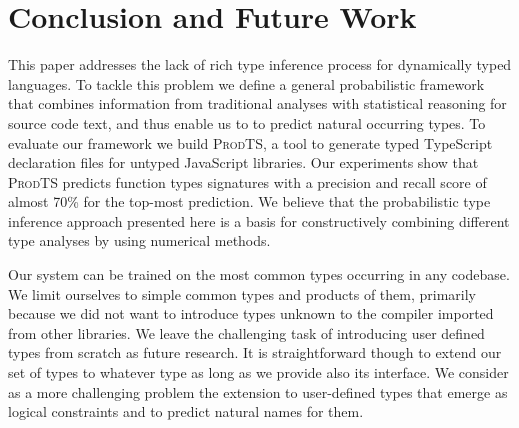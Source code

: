 \documentclass[sigplan,10pt,review,anonymous]{acmart} %
\newcommand{\prodts}{\textsc{ProdTS}\xspace}
\theoremstyle{plain}
\theoremstyle{remark}
\theoremstyle{definition}
\begin{document}

\section{Conclusion and Future Work} \label{sec:conclusion}
This paper addresses the lack of rich type inference process for
dynamically typed languages.
%
To tackle this problem we define a
general probabilistic framework that combines
information from traditional analyses with statistical reasoning
for source code text, and thus enable us to to predict natural occurring
types.
%
To evaluate our framework we build \prodts{}, a tool to
generate typed TypeScript declaration files for untyped JavaScript
libraries.
%
Our experiments show that \prodts{} predicts function types
signatures with a precision and recall score of almost 70\% for the top-most
prediction.
%
We believe that the probabilistic type inference approach presented here
is a basis for constructively combining different type analyses by using numerical methods.

Our system can be trained on the most common types occurring in any codebase.
%
We limit ourselves to simple common types and products of them,
primarily because we did not want to introduce types unknown to the compiler imported from other libraries.
%
We leave the challenging task of introducing user defined types from scratch as future research.
%
It is straightforward though to extend our set of types to whatever type as long as we provide also its interface.
%
We consider as a more challenging problem the extension to user-defined types
that emerge as logical constraints and to predict natural names for them.

\end{document}
